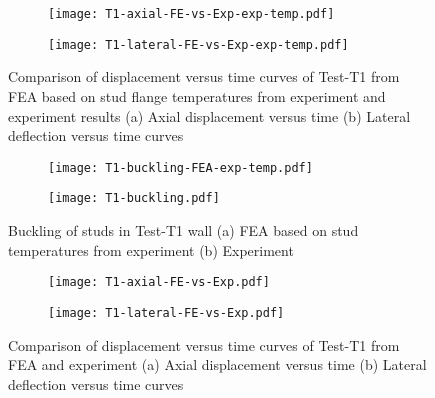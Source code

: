 \begin{figure}[!htbp]
	\centering
	\begin{subfigure}[b]{0.7\textwidth}
		\centering
		\texttt{[image: T1-axial-FE-vs-Exp-exp-temp.pdf]}
		\caption{}
		\label{subfig:T1-axial-FE-vs-Exp-exp-temp}
	\end{subfigure}
	\begin{subfigure}[b]{0.7\textwidth}
		\centering
		\texttt{[image: T1-lateral-FE-vs-Exp-exp-temp.pdf]}
		\caption{}
		\label{subfig:T1-lateral-FE-vs-Exp-exp-temp}
	\end{subfigure}
	   \caption{Comparison of displacement versus time curves of Test-T1 from FEA based on stud flange temperatures from experiment and experiment results (a) Axial displacement versus time (b) Lateral deflection versus time curves}
	   \label{fig:T1-structural-FE-vs-Exp-exp-temp}
\end{figure} 
\begin{figure}[!htbp]
	\centering
	\begin{subfigure}[b]{0.8\textwidth}
		\centering
		\texttt{[image: T1-buckling-FEA-exp-temp.pdf]}
		\caption{}
		\label{subfig:T1-buckling-FEA-exp-temp}
	\end{subfigure}
	\begin{subfigure}[b]{0.4\textwidth}
		\centering
		\texttt{[image: T1-buckling.pdf]}
		\caption{}
		\label{subfig:T1-buckling-FEA-Exp-exp-temp}
	\end{subfigure}
	   \caption{Buckling of studs in Test-T1 wall (a) FEA based on stud temperatures from experiment (b) Experiment}
	   \label{fig:T1-buckling-FE-vs-Exp-exp-temp}
\end{figure} 
\begin{figure}[!htbp]
	\centering
	\begin{subfigure}[b]{0.7\textwidth}
		\centering
		\texttt{[image: T1-axial-FE-vs-Exp.pdf]}
		\caption{}
		\label{subfig:T1-axial-FE-vs-Exp}
	\end{subfigure}
	\begin{subfigure}[b]{0.7\textwidth}
		\centering
		\texttt{[image: T1-lateral-FE-vs-Exp.pdf]}
		\caption{}
		\label{subfig:T1-lateral-FE-vs-Exp}
	\end{subfigure}
	   \caption{Comparison of displacement versus time curves of Test-T1 from FEA and experiment (a) Axial displacement versus time (b) Lateral deflection versus time curves}
	   \label{fig:T1-structural-FE-vs-Exp}
\end{figure} 
